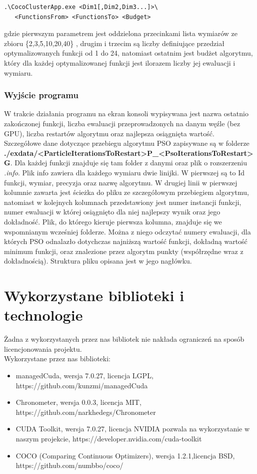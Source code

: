 \documentclass[12pt, twoside, openany, abstract=on]{report}
\theoremstyle{definition}
\begin{document}
\lstset{style=sharpc}
\begin{lstlisting}[frame=single]
.\CocoClusterApp.exe <Dim1[,Dim2,Dim3...]>\
   <FunctionsFrom> <FunctionsTo> <Budget>
\end{lstlisting}
gdzie pierwszym parametrem jest oddzielona przecinkami lista wymiarów ze zbioru \{2,3,5,10,20,40\} , drugim i trzecim są liczby definiujące przedział optymalizowanych funkcji od 1 do 24, natomiast ostatnim jest budżet algorytmu, który dla każdej optymalizowanej funkcji jest ilorazem liczby jej ewaluacji i wymiaru.

\subsection{Wyjście programu}
W trakcie działania programu na ekran konsoli wypisywana jest nazwa ostatnio zakończonej funkcji, liczba ewaluacji przeprowadzonych na danym węźle (bez GPU), liczba restartów algorytmu oraz najlepsza osiągnięta wartość.\\

Szczegółowe dane dotyczące przebiegu algorytmu PSO zapisywane są w folderze \textbf{./exdata/<ParticleIterationsToRestart>P\_<PsoIterationsToRestart>G}. Dla każdej funkcji znajduje się tam folder z danymi oraz plik o rozszerzeniu \textit{.info}. Plik info zawiera dla każdego wymiaru dwie linijki. W pierwszej są to Id funkcji, wymiar, precyzja oraz nazwę algorytmu. W drugiej linii w pierwszej kolumnie zawarta jest ścieżka do pliku ze szczegółowym przebiegiem algorytmu, natomiast w kolejnych kolumnach przedstawiony jest numer instancji funkcji, numer ewaluacji w której osiągnięto dla niej najlepszy wynik oraz jego dokładność. 
Plik, do którego kieruje pierwsza kolumna, znajduje się we wspomnianym wcześniej folderze. Można z niego odczytać numery ewaluacji, dla których PSO odnalazło dotychczas najniższą wartość funkcji, dokładną wartość minimum funkcji, oraz znalezione przez algorytm punkty (współrzędne wraz z dokładnością). Struktura pliku opisana jest w jego nagłówku. 


\chapter{Wykorzystane biblioteki i technologie}
Żadna z wykorzystanych przez nas bibliotek nie nakłada ograniczeń na sposób licencjonowania projektu. \\

Wykorzystane przez nas biblioteki:

\begin{itemize}
\item managedCuda, wersja 7.0.27, licencja LGPL, https://github.com/kunzmi/managedCuda
\item Chronometer, wersja 0.0.3, licencja MIT, https://github.com/narkhedegs/Chronometer
\item CUDA Toolkit, wersja 7.0.27, licencja NVIDIA pozwala na wykorzystanie w naszym projekcie, https://developer.nvidia.com/cuda-toolkit
\item COCO (Comparing Continuous Optimizers), wersja 1.2.1,licencja BSD, \\
https://github.com/numbbo/coco/
\end{itemize}
\end{document}
